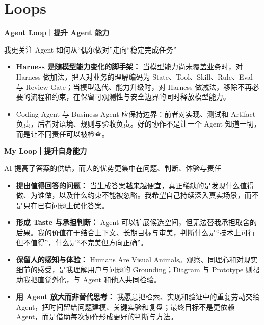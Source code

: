 \documentclass[10pt,a4paper]{article}
\newcommand{\resumeentry}[2]{%
    \noindent\textbf{#1}\par
    {\small\color{muted}#2\par}
}
\newcommand{\entrygap}{\vspace{0.25em}}
\begin{document}
\section{Loops}
\resumeentry
    {Agent Loop｜提升 Agent 能力}
    {我更关注 Agent 如何从“偶尔做对”走向“稳定完成任务”}
\begin{itemize}
    \item \textbf{Harness 是随模型能力变化的脚手架：}
    当模型能力尚未覆盖业务时，对 Harness 做加法，把人对业务的理解编码为 State、Tool、Skill、Rule、Eval 与 Review Gate；当模型迭代、能力升级时，对 Harness 做减法，移除不再必要的流程和约束，在保留可观测性与安全边界的同时释放模型能力。
    \item Coding Agent 与 Business Agent 应保持边界：前者对实现、测试和 Artifact 负责，后者对语境、规则与验收负责。好的协作不是让一个 Agent 知道一切，而是让不同责任可以被检查。
\end{itemize}

\entrygap
\resumeentry
    {My Loop｜提升自身能力}
    {AI 提高了答案的供给，而人的优势更集中在问题、判断、体验与责任}
\begin{itemize}
    \item \textbf{提出值得回答的问题：}
    当生成答案越来越便宜，真正稀缺的是发现什么值得做、为谁做，以及什么约束不能被忽略。我希望自己持续深入真实场景，而不是只在已有问题上优化答案。
    \item \textbf{形成 Taste 与承担判断：}
    Agent 可以扩展候选空间，但无法替我承担取舍的后果。我的价值在于结合上下文、长期目标与审美，判断什么是“技术上可行但不值得”，什么是“不完美但方向正确”。
    \item \textbf{保留人的感知与体验：}
    Humans Are Visual Animals。观察、同理心和对现实细节的感受，是我理解用户与问题的 Grounding；Diagram 与 Prototype 则帮助我把直觉外化，与 Agent 和他人共同检验。
    \item \textbf{用 Agent 放大而非替代思考：}
    我愿意把检索、实现和验证中的重复劳动交给 Agent，把时间留给问题建模、关键实验和复盘；最终目标不是更依赖 Agent，而是借助每次协作形成更好的判断与方法。
\end{itemize}
\end{document}
